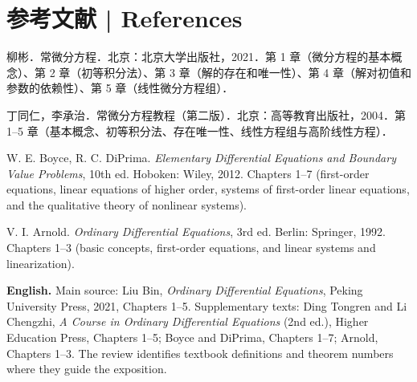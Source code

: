 \documentclass[UTF8,11pt,a4paper]{ctexart}
\newcommand{\EN}[1]{\par\noindent \textbf{English.} #1\par}
\begin{document}
\section*{参考文献 | References}
\noindent 柳彬．常微分方程．北京：北京大学出版社，2021．第 1 章（微分方程的基本概念）、第 2 章（初等积分法）、第 3 章（解的存在和唯一性）、第 4 章（解对初值和参数的依赖性）、第 5 章（线性微分方程组）．\par
\noindent 丁同仁，李承治．常微分方程教程（第二版）．北京：高等教育出版社，2004．第 1--5 章（基本概念、初等积分法、存在唯一性、线性方程组与高阶线性方程）．\par
\noindent W. E. Boyce, R. C. DiPrima. \emph{Elementary Differential Equations and Boundary Value Problems}, 10th ed. Hoboken: Wiley, 2012. Chapters 1--7 (first-order equations, linear equations of higher order, systems of first-order linear equations, and the qualitative theory of nonlinear systems).\par
\noindent V. I. Arnold. \emph{Ordinary Differential Equations}, 3rd ed. Berlin: Springer, 1992. Chapters 1--3 (basic concepts, first-order equations, and linear systems and linearization).\par
\EN{Main source: Liu Bin, \emph{Ordinary Differential Equations}, Peking University Press, 2021, Chapters 1--5. Supplementary texts: Ding Tongren and Li Chengzhi, \emph{A Course in Ordinary Differential Equations} (2nd ed.), Higher Education Press, Chapters 1--5; Boyce and DiPrima, Chapters 1--7; Arnold, Chapters 1--3. The review identifies textbook definitions and theorem numbers where they guide the exposition.}
\end{document}
